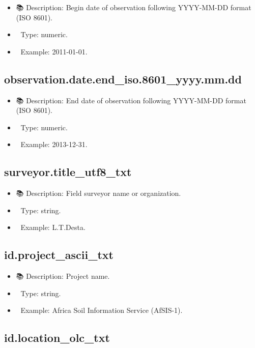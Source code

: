 \documentclass[
  letterpaper,
  DIV=11,
  numbers=noendperiod]{scrreprt}
\providecommand{\tightlist}{%
  \setlength{\itemsep}{0pt}\setlength{\parskip}{0pt}}\usepackage{longtable,booktabs,array}
\begin{document}
\begin{itemize}
\tightlist
\item
  📚 Description: Begin date of observation following YYYY-MM-DD format
  (ISO 8601).
\item
  🔢 Type: numeric.
\item
  📖 Example: 2011-01-01.
\end{itemize}

\subsection{observation.date.end\_iso.8601\_yyyy.mm.dd}\label{observation.date.end_iso.8601_yyyy.mm.dd}

\begin{itemize}
\tightlist
\item
  📚 Description: End date of observation following YYYY-MM-DD format
  (ISO 8601).
\item
  🔢 Type: numeric.
\item
  📖 Example: 2013-12-31.
\end{itemize}

\subsection{surveyor.title\_utf8\_txt}\label{surveyor.title_utf8_txt}

\begin{itemize}
\tightlist
\item
  📚 Description: Field surveyor name or organization.
\item
  🔢 Type: string.
\item
  📖 Example: L.T.Desta.
\end{itemize}

\subsection{id.project\_ascii\_txt}\label{id.project_ascii_txt}

\begin{itemize}
\tightlist
\item
  📚 Description: Project name.
\item
  🔢 Type: string.
\item
  📖 Example: Africa Soil Information Service (AfSIS-1).
\end{itemize}

\subsection{id.location\_olc\_txt}\label{id.location_olc_txt}
\end{document}
